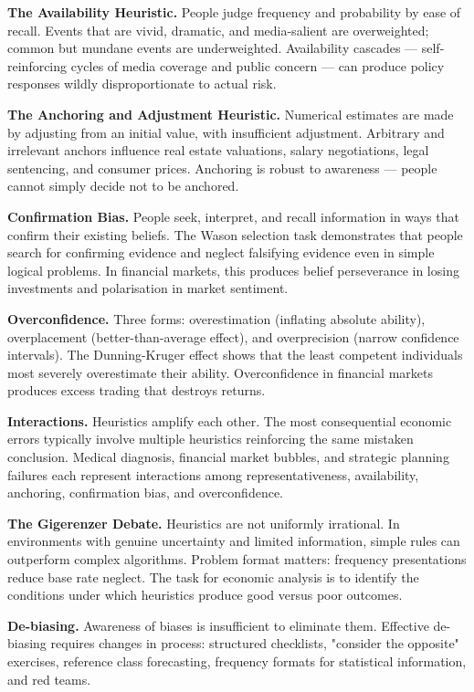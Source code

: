 \documentclass[12pt, letterpaper]{article}
\begin{document}
\textbf{The Availability Heuristic.} People judge frequency and probability by ease of recall. Events that are vivid, dramatic, and media-salient are overweighted; common but mundane events are underweighted. Availability cascades --- self-reinforcing cycles of media coverage and public concern --- can produce policy responses wildly disproportionate to actual risk.

\textbf{The Anchoring and Adjustment Heuristic.} Numerical estimates are made by adjusting from an initial value, with insufficient adjustment. Arbitrary and irrelevant anchors influence real estate valuations, salary negotiations, legal sentencing, and consumer prices. Anchoring is robust to awareness --- people cannot simply decide not to be anchored.

\textbf{Confirmation Bias.} People seek, interpret, and recall information in ways that confirm their existing beliefs. The Wason selection task demonstrates that people search for confirming evidence and neglect falsifying evidence even in simple logical problems. In financial markets, this produces belief perseverance in losing investments and polarisation in market sentiment.

\textbf{Overconfidence.} Three forms: overestimation (inflating absolute ability), overplacement (better-than-average effect), and overprecision (narrow confidence intervals). The Dunning-Kruger effect shows that the least competent individuals most severely overestimate their ability. Overconfidence in financial markets produces excess trading that destroys returns.

\textbf{Interactions.} Heuristics amplify each other. The most consequential economic errors typically involve multiple heuristics reinforcing the same mistaken conclusion. Medical diagnosis, financial market bubbles, and strategic planning failures each represent interactions among representativeness, availability, anchoring, confirmation bias, and overconfidence.

\textbf{The Gigerenzer Debate.} Heuristics are not uniformly irrational. In environments with genuine uncertainty and limited information, simple rules can outperform complex algorithms. Problem format matters: frequency presentations reduce base rate neglect. The task for economic analysis is to identify the conditions under which heuristics produce good versus poor outcomes.

\textbf{De-biasing.} Awareness of biases is insufficient to eliminate them. Effective de-biasing requires changes in process: structured checklists, "consider the opposite" exercises, reference class forecasting, frequency formats for statistical information, and red teams.
\end{document}
